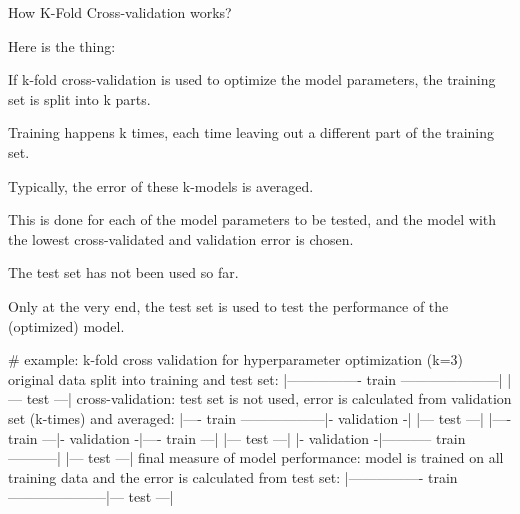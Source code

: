 	\begin{qanda}
		\begin{question}
How K-Fold Cross-validation works?
		\end{question}

		\begin{answer}Here is the thing:
		\begin{bulletedlist}
			\item If k-fold cross-validation is used to optimize the model parameters, the training set is split into k parts.
			\item Training happens k times, each time leaving out a different part of the training set.
			\item Typically, the error of these k-models is averaged.
			\item This is done for each of the model parameters to be tested, and the model with the lowest cross-validated and validation error is chosen.
			\item The test set has not been used so far.
			\item Only at the very end, the test set is used to test the performance of the (optimized) model.
		\end{bulletedlist}
		\begin{code}[\codenumbering]{}
			\codeitemnonumber \# example: k-fold cross validation for hyperparameter optimization (k=3)
			\codeitemnonumber original data split into training and test set:
			\codeitemnonumber |---------------- train ---------------------|         |--- test ---|
			\codeitemnonumber
			\codeitemnonumber cross-validation: test set is not used, error is calculated from
			\codeitemnonumber validation set (k-times) and averaged:
			\codeitemnonumber
			\codeitemnonumber |---- train ------------------|- validation -|         |--- test ---|
			\codeitemnonumber |---- train ---|- validation -|---- train ---|         |--- test ---|
			\codeitemnonumber |- validation -|----------- train -----------|         |--- test ---|
			\codeitemnonumber
			\codeitemnonumber final measure of model performance: model is trained on all training data
			\codeitemnonumber and the error is calculated from test set:
			\codeitemnonumber
			\codeitemnonumber |---------------- train ---------------------|--- test ---|
		\end{code}


\end{answer}
\end{qanda}
